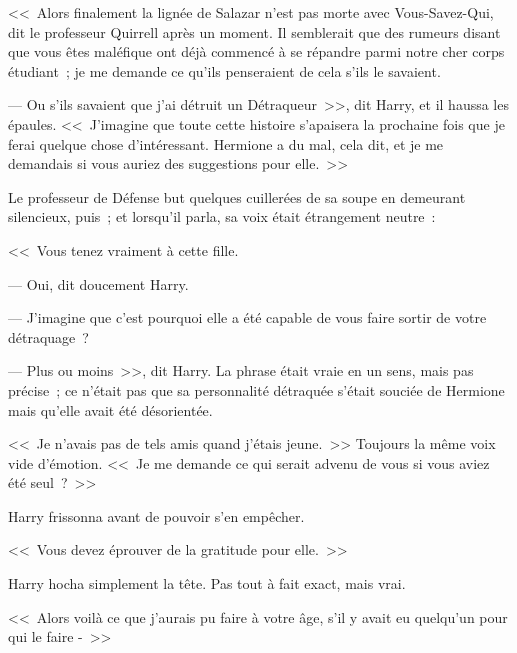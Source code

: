 <<~Alors finalement la lignée de Salazar n'est pas morte avec Vous-Savez-Qui, dit le professeur Quirrell après un moment. Il semblerait que des rumeurs disant que vous êtes maléfique ont déjà commencé à se répandre parmi notre cher corps étudiant~; je me demande ce qu'ils penseraient de cela s'ils le savaient.

--- Ou s'ils savaient que j'ai détruit un Détraqueur~>>, dit Harry, et il haussa les épaules. <<~J'imagine que toute cette histoire s'apaisera la prochaine fois que je ferai quelque chose d'intéressant. Hermione a du mal, cela dit, et je me demandais si vous auriez des suggestions pour elle.~>>

Le professeur de Défense but quelques cuillerées de sa soupe en demeurant silencieux, puis~; et lorsqu'il parla, sa voix était étrangement neutre~:

<<~Vous tenez vraiment à cette fille.

--- Oui, dit doucement Harry.

--- J'imagine que c'est pourquoi elle a été capable de vous faire sortir de votre détraquage~?

--- Plus ou moins~>>, dit Harry. La phrase était vraie en un sens, mais pas précise~; ce n'était pas que sa personnalité détraquée s'était souciée de Hermione mais qu'elle avait été désorientée.

<<~Je n'avais pas de tels amis quand j'étais jeune.~>> Toujours la même voix vide d'émotion. <<~Je me demande ce qui serait advenu de vous si vous aviez été seul~?~>>

Harry frissonna avant de pouvoir s'en empêcher.

<<~Vous devez éprouver de la gratitude pour elle.~>>

Harry hocha simplement la tête. Pas tout à fait exact, mais vrai.

<<~Alors voilà ce que j'aurais pu faire à votre âge, s'il y avait eu quelqu'un pour qui le faire -~>>
